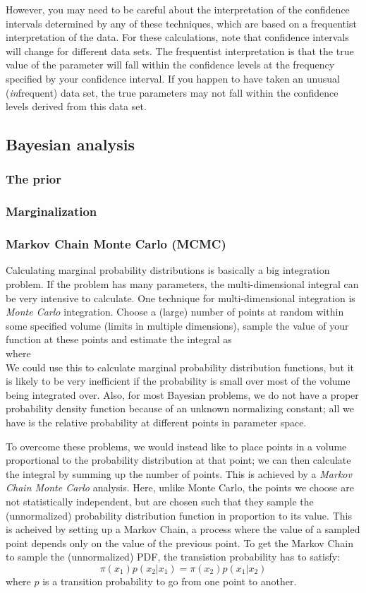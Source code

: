 \documentclass[12pt]{article}
\begin{document}
However, you may need to be careful about the interpretation of the
confidence intervals determined by any of these techniques, which are
based on a frequentist interpretation of the data. For these
calculations, note that confidence intervals will change for different
data sets. The frequentist interpretation is that the true value
of the parameter will fall within the confidence levels at the
frequency specified by your confidence interval. If you happen
to have taken an unusual (\emph{in}frequent) data set, the true
parameters may not fall within the confidence levels derived from
this data set.

\subsection{Bayesian analysis}
\subsubsection{The prior}
\subsubsection{Marginalization}
\subsubsection{Markov Chain Monte Carlo (MCMC)}
Calculating marginal probability distributions is basically a big
integration problem. If the problem has many parameters, the
multi-dimensional integral can be very intensive to calculate.
One technique for multi-dimensional integration is
\emph{Monte Carlo} integration. Choose a (large) number of points
at random within some specified volume (limits in multiple
dimensions), sample the value of your function at these points
and estimate the integral as
$$  $$
where
$$ $$
We could use this to calculate marginal probability distribution
functions, but it is likely to be very inefficient if the probability
is small over most of the volume being integrated over. Also, for
most Bayesian problems, we do not have a proper probability density
function because of an unknown normalizing constant; all we have is
the relative probability at different points in parameter space.

To overcome these problems, we would instead like to place points
in a volume proportional to the probability distribution at that
point; we can then calculate the integral by summing up the number
of points. This is achieved by a \emph{Markov Chain Monte Carlo}
analysis. Here, unlike Monte Carlo, the points we choose are not
statistically independent, but are chosen such that they sample
the (unnormalized) probability distribution function in proportion
to its value. This is acheived by setting up a Markov Chain,
a process where the value of a sampled point depends only on
the value of the previous point. To get the Markov Chain to sample
the (unnormalized) PDF, the transistion probability has to satisfy:
$$ \pi(x_1)p(x_2|x_1) = \pi(x_2)p(x_1|x_2)  $$
where $p$ is a transition probability to go from one point to another.
\end{document}
